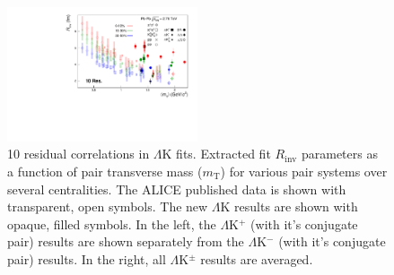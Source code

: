 \documentclass[../AnalysisNoteJBuxton.tex]{subfiles}
\begin{document}
\begin{figure}[h]
  \centering
  \includegraphics[width=0.50\textwidth]{7_ResultsAndDiscussion/Figures/mTscaling_MinvCalc_OutlinedPoints_OthersTransparent_wJaiAndHans_10Res.pdf}
  \caption[$m_{\mathrm{T}}$ Scaling of Radii: 10 Residuals in Fit]{10 residual correlations in $\Lambda$K fits.  Extracted fit $R_{\mathrm{inv}}$ parameters as a function of pair transverse mass ($m_{\mathrm{T}}$) for various pair systems over several centralities. The ALICE published data \cite{Adam:2015vja} is shown with transparent, open symbols.  The new $\Lambda$K results are shown with opaque, filled symbols.  In the left, the $\Lambda$K$^{+}$ (with it's conjugate pair) results are shown separately from the $\Lambda$K$^{-}$ (with it's conjugate pair) results.  In the right, all $\Lambda$K$^{\pm}$ results are averaged.}
  \label{fig:mTScalingOfRadii_10Res}
\end{figure}	
\end{document}
